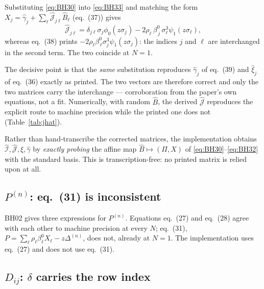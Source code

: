 \documentclass[11pt,a4paper]{article}
\newcommand{\eqBH}[1]{eq.~(#1)}
\begin{document}
Substituting \eqref{eq:BH30} into \eqref{eq:BH33} and matching the form
$X_j=\hat\gamma_j+\sum_\ell\hat{\mathcal J}_{j\ell}\hat B_\ell$ (\eqBH{37})
gives
\begin{equation}
  \hat{\mathcal J}_{j\ell}=\delta_{j\ell}\sigma_j\phi_0(z\sigma_j)
   -2\rho_\ell\,\beta^0_{\,j}\,\sigma_\ell^3\psi_1(z\sigma_\ell),
  \label{eq:Jfix}
\end{equation}
whereas \eqBH{38} prints
$-2\rho_\ell\beta^0_{\,\ell}\sigma_j^3\psi_1(z\sigma_j)$: the indices $j$ and
$\ell$ are interchanged in the second term. The two coincide at $N=1$.

The decisive point is that the \emph{same} substitution reproduces
$\hat\gamma_j$ of \eqBH{39} and $\hat\xi_j$ of \eqBH{36} exactly as printed. The
two vectors are therefore correct and only the two matrices carry the
interchange --- corroboration from the paper's own equations, not a fit.
Numerically, with random $\hat B$, the derived $\hat{\mathcal J}$ reproduces the
explicit route to machine precision while the printed one does not
(Table~\ref{tab:jhat}).

\begin{table}[htbp]
\centering\small
\caption{Maximum $|X-X_{\text{explicit}}|$ over random $\hat B$ vectors, using
the derived versus the printed $\hat{\mathcal J}$, against the explicit route
\eqref{eq:BH30}--\eqref{eq:BH33}.}
\label{tab:jhat}

\end{table}

Rather than hand-transcribe the corrected matrices, the implementation obtains
$\hat{\mathcal I},\hat{\mathcal J},\hat\xi,\hat\gamma$ by \emph{exactly probing}
the affine map $\hat B\mapsto(\Pi,X)$ of
\eqref{eq:BH30}--\eqref{eq:BH32} with the standard basis. This is
transcription-free: no printed matrix is relied upon at all.

\subsection{$P^{(n)}$: \eqBH{31} is inconsistent}
\label{sec:PN}

BH02 gives three expressions for $P^{(n)}$. Equations \eqBH{27} and \eqBH{28}
agree with each other to machine precision at every $N$; \eqBH{31},
$P=\sum_\ell\rho_\ell\beta^0_\ell X_\ell-z\Delta^{(n)}$, does not, already at
$N=1$. The implementation uses \eqBH{27} and does not use \eqBH{31}.

\subsection{$D_{ij}$: $\delta$ carries the row index}
\label{sec:eq22}
\end{document}
